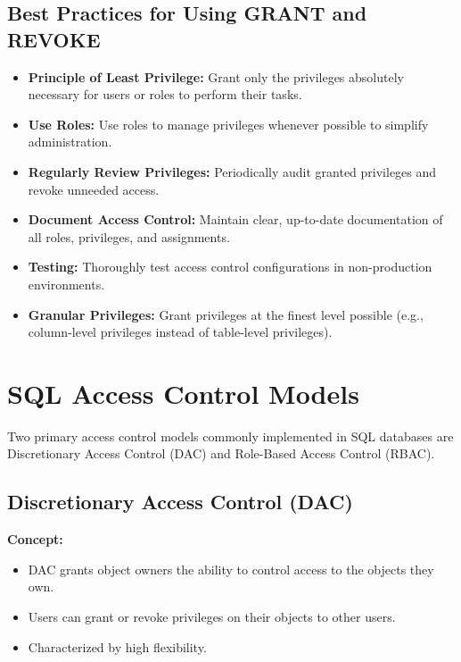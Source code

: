 \documentclass[12pt,a4paper]{article}
\begin{document}
\subsection{Best Practices for Using GRANT and REVOKE}
\begin{itemize}
    \item \textbf{Principle of Least Privilege:} Grant only the privileges absolutely necessary for users or roles to perform their tasks.
    \item \textbf{Use Roles:} Use roles to manage privileges whenever possible to simplify administration.
    \item \textbf{Regularly Review Privileges:} Periodically audit granted privileges and revoke unneeded access.
    \item \textbf{Document Access Control:} Maintain clear, up-to-date documentation of all roles, privileges, and assignments.
    \item \textbf{Testing:} Thoroughly test access control configurations in non-production environments.
    \item \textbf{Granular Privileges:} Grant privileges at the finest level possible (e.g., column-level privileges instead of table-level privileges).
\end{itemize}

\vspace{0.5cm}

\section{SQL Access Control Models}

Two primary access control models commonly implemented in SQL databases are Discretionary Access Control (DAC) and Role-Based Access Control (RBAC).

\subsection{Discretionary Access Control (DAC)}

\textbf{Concept:}
\begin{itemize}
    \item DAC grants object owners the ability to control access to the objects they own.
    \item Users can grant or revoke privileges on their objects to other users.
    \item Characterized by high flexibility.
\end{itemize}
\end{document}
